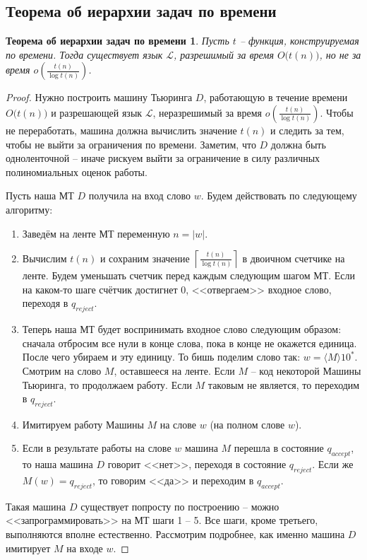 \documentclass[a4paper,12pt]{article}
\newtheorem*{timeteor}{Теорема об иерархии задач по времени}
\renewcommand{\L}{\mathscr{L}}
\begin{document}
\subsection{Теорема об иерархии задач по времени}
\begin{timeteor}
Пусть $t$ -- функция, конструируемая по времени. Тогда существует язык $\L$, разрешимый за время $O\big(t(n)\big)$, но не за время $o\left(\frac{t(n)}{\log t(n)}\right)$.
\end{timeteor}
\begin{proof}
    Нужно построить машину Тьюринга $D$, работающую в течение времени $O\big(t(n)\big)$ и разрешающей язык $\L$, неразрешимый за время $o\left(\frac{t(n)}{\log t(n)}\right)$. Чтобы не переработать, машина должна вычислить значение $t(n)$ и следить за тем, чтобы не выйти за ограничения по времени. Заметим, что $D$ должна быть одноленточной -- иначе рискуем выйти за ограничение в силу различных полиномиальных оценок работы.
    
    Пусть наша МТ $D$ получила на вход слово $w$. Будем действовать по следующему алгоритму:
    \begin{enumerate}
        \item Заведём на ленте МТ переменную $n = |w|$.
        \item Вычислим $t(n)$ и сохраним значение $\left\lceil \frac{t(n)}{\log t(n)}\right\rceil$ в двоичном счетчике на ленте. Будем уменьшать счетчик перед каждым следующим шагом МТ. Если на каком-то шаге счётчик достигнет 0, <<отвергаем>> входное слово, переходя в $q_{reject}$.
        \item Теперь наша МТ будет воспринимать входное слово следующим образом: сначала отбросим все нули в конце слова, пока в конце не окажется единица. После чего убираем и эту единицу. То бишь поделим слово так: $w = \langle M \rangle 10^*$. Смотрим на слово $M$, оставшееся на ленте. Если $M$ -- код некоторой Машины Тьюринга, то продолжаем работу. Если $M$ таковым не является, то переходим в $q_{reject}$.
        \item Имитируем работу Машины $M$ на слове $w$ (на полном слове $w$).
        \item Если в результате работы на слове $w$ машина $M$ перешла в состояние $q_{accept}$, то наша машина $D$ говорит <<нет>>, переходя в состояние $q_{reject}$. Если же $M(w) = q_{reject}$, то говорим <<да>> и переходим в $q_{accept}$.
    \end{enumerate}
    Такая машина $D$ существует попросту по построению -- можно <<запрограммировать>> на МТ шаги 1 -- 5. Все шаги, кроме третьего, выполняются вполне естественно. Рассмотрим подробнее, как именно машина $D$ имитирует $M$ на входе $w$.
    

\end{proof}
\end{document}

